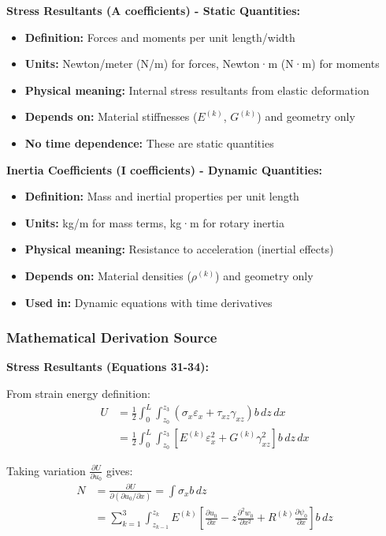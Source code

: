 \documentclass[12pt,a4paper]{article}
\begin{document}
\textbf{Stress Resultants (A coefficients) - Static Quantities:}
\begin{itemize}
\item \textbf{Definition:} Forces and moments per unit length/width
\item \textbf{Units:} Newton/meter (N/m) for forces, Newton·m (N·m) for moments
\item \textbf{Physical meaning:} Internal stress resultants from elastic deformation
\item \textbf{Depends on:} Material stiffnesses ($E^{(k)}$, $G^{(k)}$) and geometry only
\item \textbf{No time dependence:} These are static quantities
\end{itemize}

\textbf{Inertia Coefficients (I coefficients) - Dynamic Quantities:}
\begin{itemize}
\item \textbf{Definition:} Mass and inertial properties per unit length
\item \textbf{Units:} kg/m for mass terms, kg·m for rotary inertia
\item \textbf{Physical meaning:} Resistance to acceleration (inertial effects)
\item \textbf{Depends on:} Material densities ($\rho^{(k)}$) and geometry only
\item \textbf{Used in:} Dynamic equations with time derivatives
\end{itemize}

\subsubsection{Mathematical Derivation Source}

\textbf{Stress Resultants (Equations 31-34):}

From strain energy definition:
\begin{align}
U &= \frac{1}{2} \int_0^L \int_{z_0}^{z_3} (\sigma_x \varepsilon_x + \tau_{xz}\gamma_{xz}) b \, dz \, dx \\
&= \frac{1}{2} \int_0^L \int_{z_0}^{z_3} [E^{(k)}\varepsilon_x^2 + G^{(k)}\gamma_{xz}^2] b \, dz \, dx
\end{align}

Taking variation $\frac{\partial U}{\partial u_0}$ gives:
\begin{align}
N &= \frac{\partial U}{\partial (\partial u_0/\partial x)} = \int \sigma_x b \, dz \\
&= \sum_{k=1}^{3} \int_{z_{k-1}}^{z_k} E^{(k)}\left[\frac{\partial u_0}{\partial x} - z\frac{\partial^2 w_0}{\partial x^2} + R^{(k)}\frac{\partial \psi_0}{\partial x}\right] b \, dz
\end{align}
\end{document}
